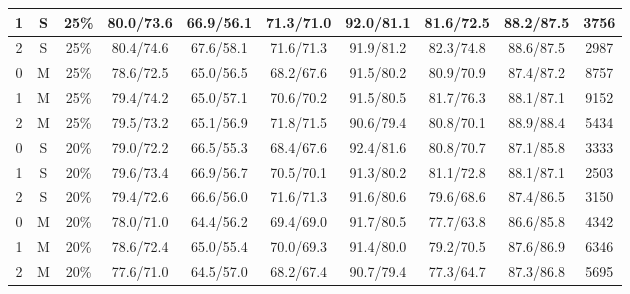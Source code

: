 \begin{table*}
\begin{tabular}{|c|c|c||c|c|c|c|c|c||c|}
1 & S & 25\% & 80.0/73.6 & 66.9/56.1 & 71.3/71.0 & 92.0/81.1 & 81.6/72.5 & 88.2/87.5 & 3756 \\ \hline
2 & S & 25\% & 80.4/74.6 & 67.6/58.1 & 71.6/71.3 & 91.9/81.2 & 82.3/74.8 & 88.6/87.5 & 2987 \\ \hline
0 & M & 25\% & 78.6/72.5 & 65.0/56.5 & 68.2/67.6 & 91.5/80.2 & 80.9/70.9 & 87.4/87.2 & 8757 \\ \hline
1 & M & 25\% & 79.4/74.2 & 65.0/57.1 & 70.6/70.2 & 91.5/80.5 & 81.7/76.3 & 88.1/87.1 & 9152 \\ \hline
2 & M & 25\% & 79.5/73.2 & 65.1/56.9 & 71.8/71.5 & 90.6/79.4 & 80.8/70.1 & 88.9/88.4 & 5434 \\ \hline
0 & S & 20\% & 79.0/72.2 & 66.5/55.3 & 68.4/67.6 & 92.4/81.6 & 80.8/70.7 & 87.1/85.8 & 3333 \\ \hline
1 & S & 20\% & 79.6/73.4 & 66.9/56.7 & 70.5/70.1 & 91.3/80.2 & 81.1/72.8 & 88.1/87.1 & 2503 \\ \hline
2 & S & 20\% & 79.4/72.6 & 66.6/56.0 & 71.6/71.3 & 91.6/80.6 & 79.6/68.6 & 87.4/86.5 & 3150 \\ \hline
0 & M & 20\% & 78.0/71.0 & 64.4/56.2 & 69.4/69.0 & 91.7/80.5 & 77.7/63.8 & 86.6/85.8 & 4342 \\ \hline
1 & M & 20\% & 78.6/72.4 & 65.0/55.4 & 70.0/69.3 & 91.4/80.0 & 79.2/70.5 & 87.6/86.9 & 6346 \\ \hline
2 & M & 20\% & 77.6/71.0 & 64.5/57.0 & 68.2/67.4 & 90.7/79.4 & 77.3/64.7 & 87.3/86.8 & 5695 \\ \hline
\end{tabular}
\end{table*}


